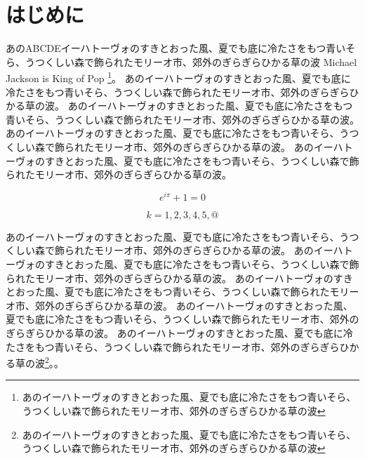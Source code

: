 \documentclass[b5j,12pt]{ltjsbook}
\begin{document}
\frontmatter


\chapter*{はじめに}

\textsf{あのABCDE}イーハトーヴォのすきとおった風、夏でも底に冷たさをもつ青いそら、うつくしい森で飾られたモリーオ市、郊外のぎらぎらひかる草の波
Michael Jackson is King of Pop
\footnote{あのイーハトーヴォのすきとおった風、夏でも底に冷たさをもつ青いそら、うつくしい森で飾られたモリーオ市、郊外のぎらぎらひかる草の波}。
あのイーハトーヴォのすきとおった風、夏でも底に冷たさをもつ青いそら、うつくしい森で飾られたモリーオ市、郊外のぎらぎらひかる草の波。
あのイーハトーヴォのすきとおった風、夏でも底に冷たさをもつ青いそら、うつくしい森で飾られたモリーオ市、郊外のぎらぎらひかる草の波。
あのイーハトーヴォのすきとおった風、夏でも底に冷たさをもつ青いそら、うつくしい森で飾られたモリーオ市、郊外のぎらぎらひかる草の波。
あのイーハトーヴォのすきとおった風、夏でも底に冷たさをもつ青いそら、うつくしい森で飾られたモリーオ市、郊外のぎらぎらひかる草の波。

\begin{equation}
e^{i \pi} + 1 = 0
\end{equation}

\begin{equation}
k = 1, 2, 3, 4, 5, @
\end{equation}

あのイーハトーヴォのすきとおった風、夏でも底に冷たさをもつ青いそら、うつくしい森で飾られたモリーオ市、郊外のぎらぎらひかる草の波。
あのイーハトーヴォのすきとおった風、夏でも底に冷たさをもつ青いそら、うつくしい森で飾られたモリーオ市、郊外のぎらぎらひかる草の波。
あのイーハトーヴォのすきとおった風、夏でも底に冷たさをもつ青いそら、うつくしい森で飾られたモリーオ市、郊外のぎらぎらひかる草の波。
あのイーハトーヴォのすきとおった風、夏でも底に冷たさをもつ青いそら、うつくしい森で飾られたモリーオ市、郊外のぎらぎらひかる草の波。
あのイーハトーヴォのすきとおった風、夏でも底に冷たさをもつ青いそら、うつくしい森で飾られたモリーオ市、郊外のぎらぎらひかる草の波\footnote{あのイーハトーヴォのすきとおった風、夏でも底に冷たさをもつ青いそら、うつくしい森で飾られたモリーオ市、郊外のぎらぎらひかる草の波}。。
\end{document}
